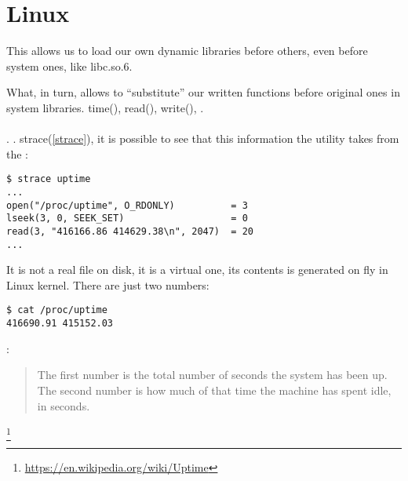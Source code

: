 \section{ \InENRU Linux}


{This allows us to load our own dynamic libraries before others, even before system ones, like} libc.so.6.

{What, in turn, allows to ``substitute'' our written functions before original ones in system libraries.}
time(), read(), write(), . \\
\\
.
.
 strace(\ref{strace}), 
{it is possible to see that this information the utility takes from the} 
:

\begin{lstlisting}
$ strace uptime 
...
open("/proc/uptime", O_RDONLY)          = 3
lseek(3, 0, SEEK_SET)                   = 0
read(3, "416166.86 414629.38\n", 2047)  = 20
...
\end{lstlisting}

{It is not a real file on disk, it is a virtual one, its contents is generated on fly in Linux kernel.}
{There are just two numbers}:

\begin{lstlisting}
$ cat /proc/uptime
416690.91 415152.03
\end{lstlisting}

:

\begin{framed}
\begin{quotation}
The first number is the total number of seconds the system has been up.
The second number is how much of that time the machine has spent idle, in seconds.
\end{quotation}
\end{framed}\footnote{\url{https://en.wikipedia.org/wiki/Uptime}}

